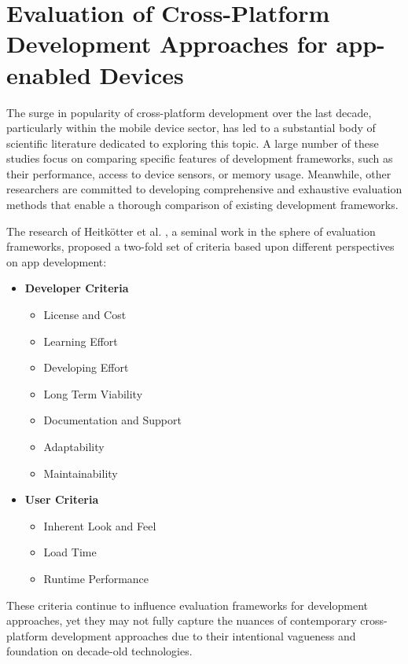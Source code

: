 \section{Evaluation of Cross-Platform Development Approaches for app-enabled Devices}
The surge in popularity of cross-platform development over the last decade, particularly within the mobile device sector, has led to a substantial body of scientific literature dedicated to exploring this topic. A large number of these studies focus on comparing specific features of development frameworks, such as their performance, access to device sensors, or memory usage. Meanwhile, other researchers are committed to developing comprehensive and exhaustive evaluation methods that enable a thorough comparison of existing development frameworks.

The research of Heitkötter et al. \cite{Heitkotter.2013}, a seminal work in the sphere of evaluation frameworks, proposed a two-fold set of criteria based upon different perspectives on app development:
\begin{itemize}
    \item \textbf{Developer Criteria}
    \begin{itemize}
        \item License and Cost
        \item Learning Effort
        \item Developing Effort
        \item Long Term Viability
        \item Documentation and Support
        \item Adaptability
        \item Maintainability
    \end{itemize}
    \item \textbf{User Criteria} 
    \begin{itemize}
        \item Inherent Look and Feel
        \item Load Time
        \item Runtime Performance
    \end{itemize}
\end{itemize}
These criteria continue to influence evaluation frameworks for development approaches, yet they may not fully capture the nuances of contemporary cross-platform development approaches due to their intentional vagueness and foundation on decade-old technologies. 

